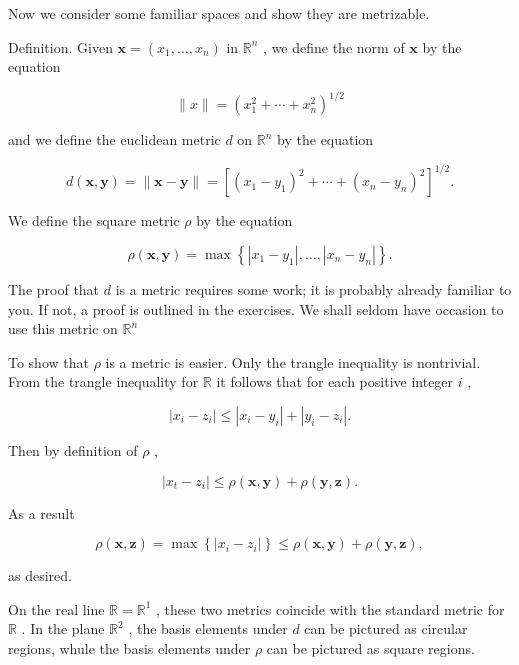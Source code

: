 \documentclass[10pt]{article}
\begin{document}
Now we consider some familiar spaces and show they are metrizable.

Definition. Given \(\mathbf{x} = \left( {{x}_{1},\ldots ,{x}_{n}}\right)\) in \({\mathbb{R}}^{n}\) , we define the norm of \(\mathbf{x}\) by the equation

\[
\parallel x\parallel  = {\left( {x}_{1}^{2} + \cdots  + {x}_{n}^{2}\right) }^{1/2}
\]

and we define the euclidean metric \(d\) on \({\mathbb{R}}^{n}\) by the equation

\[
d\left( {\mathbf{x},\mathbf{y}}\right)  = \parallel \mathbf{x} - \mathbf{y}\parallel  = {\left\lbrack  {\left( {x}_{1} - {y}_{1}\right) }^{2} + \cdots  + {\left( {x}_{n} - {y}_{n}\right) }^{2}\right\rbrack  }^{1/2}.
\]

We define the square metric \(\rho\) by the equation

\[
\rho \left( {\mathbf{x},\mathbf{y}}\right)  = \max \left\{  {\left| {{x}_{1} - {y}_{1}}\right| ,\ldots ,\left| {{x}_{n} - {y}_{n}}\right| }\right\}  .
\]

The proof that \(d\) is a metric requires some work; it is probably already familiar to you. If not, a proof is outlined in the exercises. We shall seldom have occasion to use this metric on \({\mathbb{R}}^{n}\)

To show that \(\rho\) is a metric is easier. Only the trangle inequality is nontrivial. From the trangle inequality for \(\mathbb{R}\) it follows that for each positive integer \(i\) ,

\[
\left| {{x}_{i} - {z}_{i}}\right|  \leq  \left| {{x}_{i} - {y}_{i}}\right|  + \left| {{y}_{i} - {z}_{i}}\right| .
\]

Then by definition of \(\rho\) ,

\[
\left| {{x}_{t} - {z}_{i}}\right|  \leq  \rho \left( {\mathbf{x},\mathbf{y}}\right)  + \rho \left( {\mathbf{y},\mathbf{z}}\right) .
\]

As a result

\[
\rho \left( {\mathbf{x},\mathbf{z}}\right)  = \max \left\{  \left| {{x}_{i} - {z}_{i}}\right| \right\}   \leq  \rho \left( {\mathbf{x},\mathbf{y}}\right)  + \rho \left( {\mathbf{y},\mathbf{z}}\right) ,
\]

as desired.

On the real line \(\mathbb{R} = {\mathbb{R}}^{1}\) , these two metrics coincide with the standard metric for \(\mathbb{R}\) . In the plane \({\mathbb{R}}^{2}\) , the basis elements under \(d\) can be pictured as circular regions, whule the basis elements under \(\rho\) can be pictured as square regions.
\end{document}
